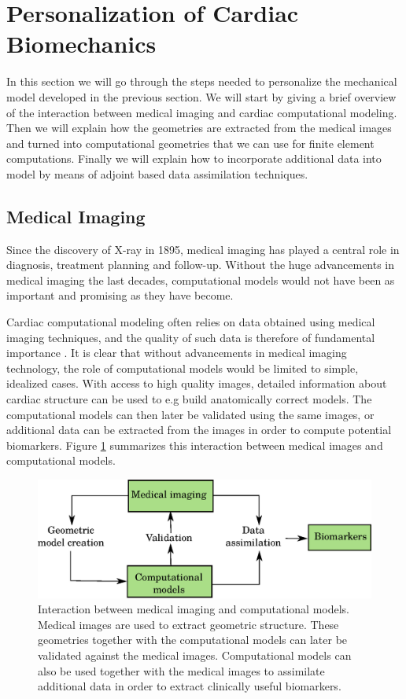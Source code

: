 \section{Personalization of Cardiac Biomechanics}
\label{sec:intro_personalization}
In this section we will go through the steps needed to personalize the
mechanical model developed in the previous section. We will start by
giving a brief overview of the interaction between medical imaging and
cardiac computational modeling. Then we will explain how the geometries
are extracted from the medical images and turned into computational
geometries that we can use for finite element computations. Finally we
will explain how to incorporate additional data into model by means of
adjoint based data assimilation techniques.


\subsection{Medical Imaging}

Since the discovery of X-ray in 1895, medical imaging has played a central
role in diagnosis, treatment planning and follow-up. Without the huge
advancements in medical imaging the last decades, computational models
would not have been as important and promising as they have become.


Cardiac computational modeling often relies on data obtained using
medical imaging techniques, and the quality of such data is therefore of
fundamental importance \cite{lamata2014images}. It is clear that
without advancements in medical imaging technology, the role of
computational models would be limited to simple, idealized cases. With
access to high quality images, detailed information about cardiac structure
can be used to e.g build anatomically correct models. The
computational models can then later be validated using the same
images, or additional data can be extracted from the images in order to
compute potential biomarkers. Figure \ref{fig:cardiac_imaging_model} summarizes
this interaction between medical images and computational models. 

\begin{figure}[htbp]
  \centering
    \includegraphics[width=\textwidth]{chapters/introduction/figures/models.eps}
\caption{Interaction between medical imaging and computational
  models. Medical images are used to extract geometric
  structure. These geometries together with the computational models
  can later be validated against the medical images. Computational
  models can also be used together with the medical images to
  assimilate additional data in order to extract clinically useful
  biomarkers. }
\label{fig:cardiac_imaging_model}
\end{figure}




